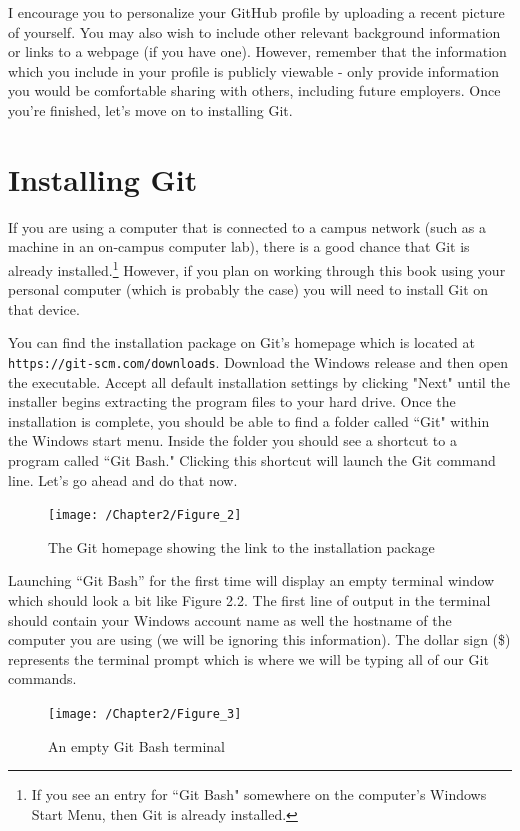 \documentclass{book}
\begin{document}
I encourage you to personalize your GitHub profile by uploading a recent picture of yourself. You may also wish to include  other relevant background information  or links to a webpage (if you have one). However, remember that the information which you include in your profile is publicly viewable - only provide information you would be comfortable sharing with others, including future employers. Once you're finished, let's move on to installing Git.

\section{Installing Git}

If you are using a computer that is connected to a campus network (such as a machine in an on-campus computer lab), there is a good chance that Git is already installed.\footnote{If you see an entry for ``Git Bash" somewhere on the computer's Windows Start Menu, then Git is already installed.} However, if you plan on working through this book using your personal computer (which is probably the case) you will need to install Git on that device.

You can find the installation package on Git's homepage which is located at \texttt{https://git-scm.com/downloads}. Download the Windows release and then open the executable. Accept all default installation settings by clicking "Next" until the installer begins extracting the program files to your hard drive. Once the installation is complete, you should be able to find a folder called ``Git" within the Windows start menu. Inside the folder you should see a shortcut to a program called ``Git Bash." Clicking this shortcut will launch the Git command line. Let's go ahead and do that now.

\begin{figure}[h]
	\caption{The Git homepage showing the link to the installation package}
	\centering\texttt{[image: /Chapter2/Figure\_2]}
\end{figure}

Launching ``Git Bash'' for the first time will display an empty terminal window which should look a bit like Figure 2.2. The first line of output in the terminal should contain your Windows account name as well the hostname of the computer you are using (we will be ignoring this information). The dollar sign (\$) represents the terminal prompt which is where we will be typing all of our Git commands.

\begin{figure}[h]
	\caption{An empty Git Bash terminal}
	\centering\texttt{[image: /Chapter2/Figure\_3]}
\end{figure}
\end{document}
